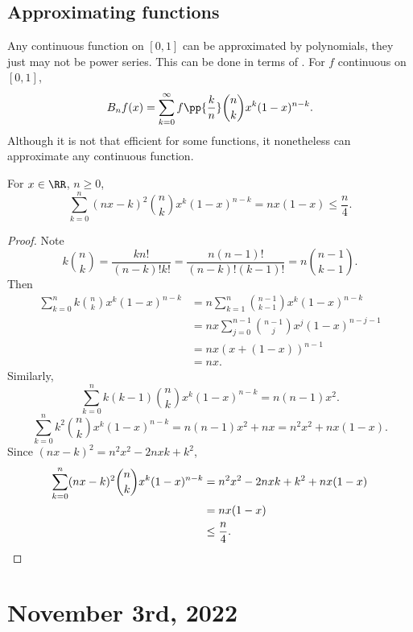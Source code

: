 \documentclass[11pt]{scrartcl}
\numberwithin{equation}{section}
\begin{document}
\subsection{Approximating functions}
Any continuous function on $[0,1]$ can be approximated by polynomials, 
they just may not be power series. This can be done in 
terms of . For $f$ continuous on $[0,1]$,
\[
    B_nf(x) = \sum_{k=0}^{\infty}f\pp{\frac{k}{n}}\binom{n}{k}x^k(1-x)^{n-k}.
\]
Although it is not that efficient for some functions, it 
nonetheless can approximate any continuous function.

\begin{lemma}
    For $x\in\RR$, $n\geq0$,
    \[
        \sum_{k=0}^{n}(nx-k)^2\binom{n}{k}x^k(1-x)^{n-k}=nx(1-x)\leq \frac{n}{4}.
    \]
\end{lemma}

\begin{proof}
    Note 
    \[
        k\binom{n}{k}=\frac{kn!}{(n-k)!k!} = \frac{n(n-1)!}{(n-k)!(k-1)!}
        =n\binom{n-1}{k-1}.
    \]
    Then
    \begin{align*}
        \sum_{k=0}^{n}k\binom{n}{k}x^k(1-x)^{n-k} &= n \sum_{k=1}^{n}\binom{n-1}{k-1}x^k(1-x)^{n-k} \\
        &= nx \sum_{j=0}^{n-1}\binom{n-1}{j}x^j(1-x)^{n-j-1} \\
        &= nx (x+(1-x))^{n-1} \\
        &= nx.
    \end{align*}
    Similarly, 
    \[
        \sum_{k=0}^{n}k(k-1)\binom{n}{k}x^k(1-x)^{n-k}=n(n-1)x^2.
    \]
    \[
        \sum_{k=0}^{n}k^2\binom{n}{k}x^k(1-x)^{n-k} = n(n-1)x^2+nx = n^2x^2+nx(1-x).
    \]
    Since $(nx-k)^2=n^2x^2-2nxk+k^2$, 
    \begin{align*}
        \sum_{k=0}^{n}(nx-k)^2\binom{n}{k}x^k(1-x)^{n-k} &= n^2x^2-2nxk+k^2 + nx(1-x) \\
        &= nx(1-x)\\
        &\leq \frac{n}{4}.\qedhere
    \end{align*}
\end{proof}

\clearpage
\section{November 3rd, 2022}
\end{document}
